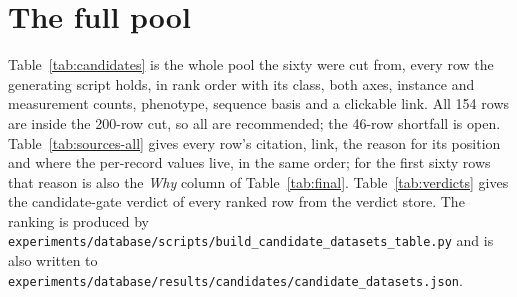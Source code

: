 
\clearpage
\section{The full pool}\label{sec:full}

Table~\ref{tab:candidates} is the whole pool the sixty were cut from, every row the
generating script holds, in rank order with its class, both axes, instance and measurement
counts, phenotype, sequence basis and a clickable link. All 154 rows are inside the 200-row
cut, so all are recommended; the 46-row shortfall is open. Table~\ref{tab:sources-all}
gives every row's citation, link, the reason for its position and where the per-record
values live, in the same order; for the first sixty rows that reason is also the
\emph{Why} column of Table~\ref{tab:final}. Table~\ref{tab:verdicts} gives the candidate-gate
verdict of every ranked row from the verdict store. The ranking is produced by
\texttt{experiments/database/scripts/build\_candidate\_datasets\_table.py} and is also
written to \texttt{experiments/database/results/candidates/candidate\_datasets.json}.



\clearpage


\clearpage

